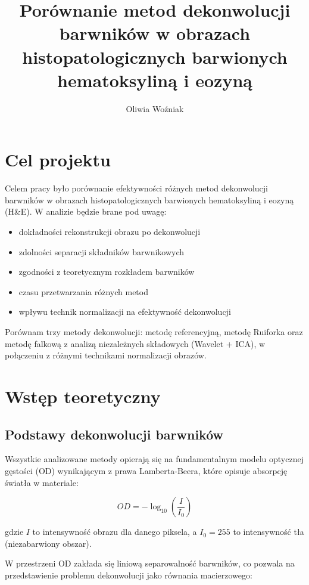 \documentclass{article}
\title{Porównanie metod dekonwolucji barwników w obrazach histopatologicznych barwionych hematoksyliną i eozyną}
\author{Oliwia Woźniak}
\date{} %
\begin{document}
\maketitle

\section{Cel projektu}
Celem pracy było porównanie efektywności różnych metod dekonwolucji barwników w obrazach histopatologicznych barwionych hematoksyliną i eozyną (H\&E). W analizie będzie brane pod uwagę:
\begin{itemize}
\item dokładności rekonstrukcji obrazu po dekonwolucji
\item zdolności separacji składników barwnikowych
\item zgodności z teoretycznym rozkładem barwników
\item czasu przetwarzania różnych metod
\item wpływu technik normalizacji na efektywność dekonwolucji
\end{itemize}

Porównam trzy metody dekonwolucji: metodę referencyjną, metodę Ruiforka oraz metodę falkową z analizą niezależnych składowych (Wavelet + ICA), w połączeniu z różnymi technikami normalizacji obrazów.

\section{Wstęp teoretyczny}

\subsection{Podstawy dekonwolucji barwników}

Wszystkie analizowane metody opierają się na fundamentalnym modelu optycznej gęstości (OD) wynikającym z prawa Lamberta-Beera, które opisuje absorpcję światła w materiale:

\begin{equation}
OD = -\log_{10}\left(\frac{I}{I_0}\right)
\end{equation}

gdzie $I$ to intensywność obrazu dla danego piksela, a $I_0 = 255$ to intensywność tła (niezabarwiony obszar). 

W przestrzeni OD zakłada się liniową separowalność barwników, co pozwala na przedstawienie problemu dekonwolucji jako równania macierzowego:
\end{document}
